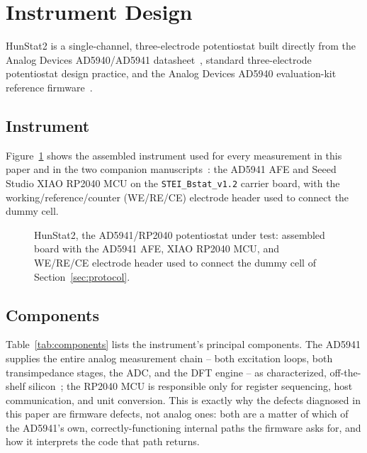 \section{Instrument Design}
\label{sec:instrument-design}

HunStat2 is a single-channel, three-electrode potentiostat built directly
from the Analog Devices AD5940/AD5941 datasheet~\cite{devices2024ad5940},
standard three-electrode potentiostat design practice, and the Analog
Devices AD5940 evaluation-kit reference firmware~\cite{ad5940_examples_github}.

\subsection{Instrument}
\label{sec:device-photo}
Figure~\ref{fig:device-photo} shows the assembled instrument used for every
measurement in this paper and in the two companion
manuscripts~\cite{clement2026linearity,clement2026architecture}: the AD5941
AFE and Seeed Studio XIAO RP2040 MCU on the \texttt{STEI\_Bstat\_v1.2}
carrier board, with the working/reference/counter (WE/RE/CE) electrode
header used to connect the dummy cell.

\begin{figure}[h]
\centering
{}
\caption{HunStat2, the AD5941/RP2040 potentiostat under test: assembled
board with the AD5941 AFE, XIAO RP2040 MCU, and WE/RE/CE electrode header
used to connect the dummy cell of Section~\ref{sec:protocol}.}
\label{fig:device-photo}
\end{figure}

\subsection{Components}
\label{sec:components}
Table~\ref{tab:components} lists the instrument's principal components.
The AD5941 supplies the entire analog measurement chain -- both excitation
loops, both transimpedance stages, the ADC, and the DFT engine -- as
characterized, off-the-shelf silicon~\cite{devices2024ad5940}; the RP2040
MCU is responsible only for register sequencing, host communication, and
unit conversion. This is exactly why the defects diagnosed in this paper
are firmware defects, not analog ones: both are a matter of which of the
AD5941's own, correctly-functioning internal paths the firmware asks for,
and how it interprets the code that path returns.

